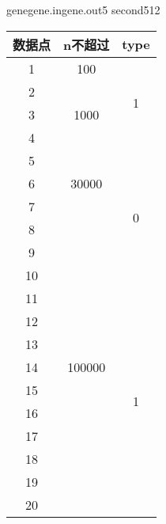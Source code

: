 \documentclass[11pt,a4paper,oneside]{article}
\begin{document}
\begin{problem}{gene}{gene.in}{gene.out}{5 second}{512}
	\begin{table}[!htbp]
		\begin{tabular}{|c|c|c|}
			\hline
			数据点 & n不超过                     & type                \\ \hline
			1   & 100                      & \multirow{4}{*}{1}  \\ \cline{1-2}
			2   & \multirow{3}{*}{1000}    &                     \\ \cline{1-1}
			3   &                          &                     \\ \cline{1-1}
			4   &                          &                     \\ \hline
			5   & \multirow{3}{*}{30000}   & \multirow{6}{*}{0}  \\ \cline{1-1}
			6   &                          &                     \\ \cline{1-1}
			7   &                          &                     \\ \cline{1-2}
			8   & \multirow{13}{*}{100000} &                     \\ \cline{1-1}
			9   &                          &                     \\ \cline{1-1}
			10  &                          &                     \\ \cline{1-1} \cline{3-3} 
			11  &                          & \multirow{10}{*}{1} \\ \cline{1-1}
			12  &                          &                     \\ \cline{1-1}
			13  &                          &                     \\ \cline{1-1}
			14  &                          &                     \\ \cline{1-1}
			15  &                          &                     \\ \cline{1-1}
			16  &                          &                     \\ \cline{1-1}
			17  &                          &                     \\ \cline{1-1}
			18  &                          &                     \\ \cline{1-1}
			19  &                          &                     \\ \cline{1-1}
			20  &                          &                     \\ \hline
		\end{tabular}
	\end{table}

\end{problem}
\end{document}
